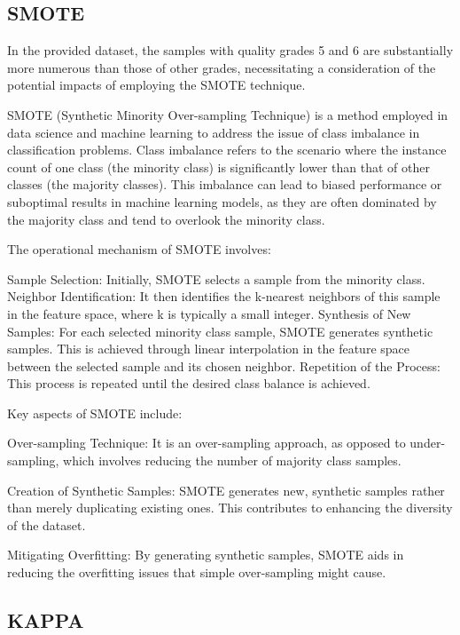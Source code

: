 \subsection{SMOTE}\phantom{...}

In the provided dataset, the samples with quality grades 5 and 6 are substantially more numerous than those of other grades, necessitating a consideration of the potential impacts of employing the SMOTE technique.

SMOTE (Synthetic Minority Over-sampling Technique) is a method employed in data science and machine learning to address the issue of class imbalance in classification problems. Class imbalance refers to the scenario where the instance count of one class (the minority class) is significantly lower than that of other classes (the majority classes). This imbalance can lead to biased performance or suboptimal results in machine learning models, as they are often dominated by the majority class and tend to overlook the minority class. 

The operational mechanism of SMOTE involves:

Sample Selection: Initially, SMOTE selects a sample from the minority class.
Neighbor Identification: It then identifies the k-nearest neighbors of this sample in the feature space, where k is typically a small integer.
Synthesis of New Samples: For each selected minority class sample, SMOTE generates synthetic samples. This is achieved through linear interpolation in the feature space between the selected sample and its chosen neighbor.
Repetition of the Process: This process is repeated until the desired class balance is achieved.

Key aspects of SMOTE include:

Over-sampling Technique: It is an over-sampling approach, as opposed to under-sampling, which involves reducing the number of majority class samples.

Creation of Synthetic Samples: SMOTE generates new, synthetic samples rather than merely duplicating existing ones. This contributes to enhancing the diversity of the dataset.

Mitigating Overfitting: By generating synthetic samples, SMOTE aids in reducing the overfitting issues that simple over-sampling might cause.


\subsection{KAPPA}\phantom{...}

